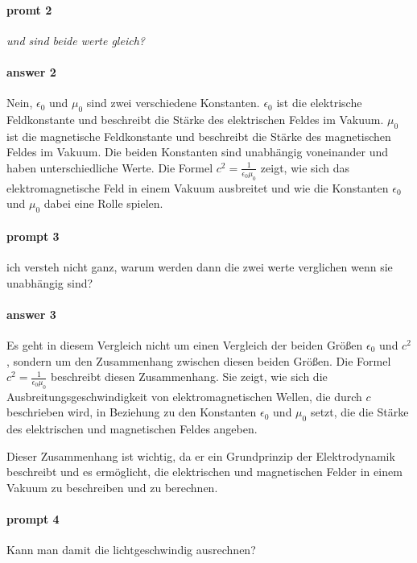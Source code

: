 \documentclass{article}
\begin{document}
\paragraph{promt 2} %
\label{par:promt 2paragraph name}
\textit{und sind beide werte gleich?}

\paragraph{answer 2} %
\label{par:answer 2}
Nein, $\epsilon_0$ und $\mu_0$ sind zwei verschiedene Konstanten. $\epsilon_0$
ist die elektrische Feldkonstante und beschreibt die Stärke des elektrischen
Feldes im Vakuum. $\mu_0$ ist die magnetische Feldkonstante und beschreibt die
Stärke des magnetischen Feldes im Vakuum. Die beiden Konstanten sind unabhängig
voneinander und haben unterschiedliche Werte. Die Formel $c^2 =
\frac{1}{\epsilon_0 \mu_0}$ zeigt, wie sich das elektromagnetische Feld in
einem Vakuum ausbreitet und wie die Konstanten $\epsilon_0$ und $\mu_0$ dabei
eine Rolle spielen.

\paragraph{prompt 3} %
\label{par:prompt 3paragraph name}
ich versteh nicht ganz, warum werden dann die zwei werte verglichen wenn sie
unabhängig sind?

\paragraph{answer 3} %
\label{par:answer 3}
Es geht in diesem Vergleich nicht um einen Vergleich der beiden Größen
$\epsilon_0$ und $c^2$, sondern um den Zusammenhang zwischen diesen beiden
Größen. Die Formel $c^2 = \frac{1}{\epsilon_0 \mu_0}$ beschreibt diesen
Zusammenhang. Sie zeigt, wie sich die Ausbreitungsgeschwindigkeit von
elektromagnetischen Wellen, die durch $c$ beschrieben wird, in Beziehung zu den
Konstanten $\epsilon_0$ und $\mu_0$ setzt, die die Stärke des elektrischen und
magnetischen Feldes angeben.

Dieser Zusammenhang ist wichtig, da er ein Grundprinzip der Elektrodynamik
beschreibt und es ermöglicht, die elektrischen und magnetischen Felder in einem
Vakuum zu beschreiben und zu berechnen.

\paragraph{prompt 4} %
\label{par:prompt 4}
Kann man damit die lichtgeschwindig ausrechnen?
\end{document}
